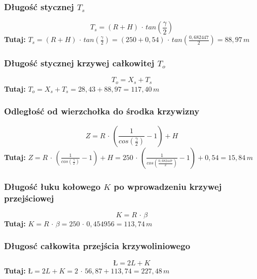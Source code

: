 \documentclass[12pt]{article}
\begin{document}
        \subsubsection{Długość stycznej \(T_{s} \)}
            \begin{equation}
                T_{s} = (R+H) \,\cdot\, tan(\frac{\gamma}{2})
            \end{equation}
            \textbf{Tutaj:} \( T_{s} = (R+H) \,\cdot\, tan(\frac{\gamma}{2}) = (250 + 0,54) \,\cdot\, tan(\frac{0,682447}{2})=88,97\,m \)
        
        \subsubsection{Długość stycznej krzywej całkowitej \(T_{o}\)}
            \begin{equation}
                T_{o} = X_{s} + T_{s}
            \end{equation}
            \textbf{Tutaj:}  \( T_{o} = X_{s} + T_{s} = 28,43 + 88,97 = 117,40\,m \) 
        
            \subsubsection{Odległość od wierzchołka do środka krzywizny}
                \begin{equation}
                    Z = R \,\cdot\, ( \frac{1}{cos(\frac{\gamma}{2})} - 1) + H
                \end{equation}
                \textbf{Tutaj:} \(  Z = R \,\cdot\, ( \frac{1}{cos(\frac{\gamma}{2})} - 1) + H
                = 250 \,\cdot\, (\frac{1}{cos(\frac{0,682447}{2})} - 1) + 0,54
                = 15,84\,m\)

            \subsubsection{Długość łuku kołowego \(K\) po wprowadzeniu krzywej przejściowej}
                \begin{equation}
                    K = R \,\cdot\, \beta
                \end{equation}
                \textbf{Tutaj:} \( K = R \,\cdot\, \beta = 250 \,\cdot\, 0,454956 = 113,74\,m \)

            \subsubsection{Długosć całkowita przejścia krzywoliniowego}
                \begin{equation}
                    \mbox{Ł} = 2L + K
                \end{equation}
                \textbf{Tutaj:}  \( \mbox{Ł} = 2L + K = 2 \,\cdot\, 56,87 + 113,74 = 227,48\,m\)
                \newpage
\end{document}
